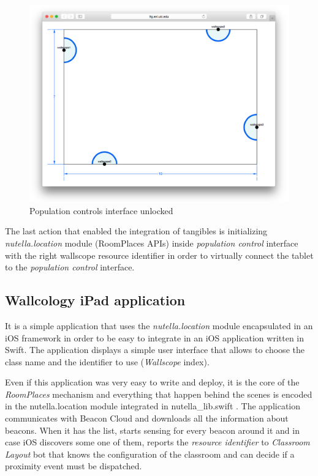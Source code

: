\begin{figure}
\centering
\includegraphics[width=4.5in]{images/wallcology-classroom-layout.png}
\caption{Population controls interface unlocked}
\label{fig:wallcology_classroom_layout}
\end{figure}

The last action that enabled the integration of tangibles is initializing \textit{nutella.location} module (RoomPlaces APIs) inside \textit{population control} interface with the right wallscope resource identifier in order to virtually connect the tablet to the \textit{population control} interface.

\subsection{Wallcology iPad application}
It is a simple application that uses the \textit{nutella.location} module encapsulated in an iOS framework in order to be easy to integrate in an iOS application written in Swift. The application displays a simple user interface that allows to choose the class name and the identifier to use (\textit{Wallscope} index).

Even if this application was very easy to write and deploy, it is the core of the \textit{RoomPlaces} mechanism and everything that happen behind the scenes is encoded in the nutella.location module integrated in nutella\_lib.swift \cite{nutella_lib_swift}. The application communicates with Beacon Cloud and downloads all the information about beacons. When it has the list, starts sensing for every beacon around it and in case iOS discovers some one of them, reports the \textit{resource identifier} to \textit{Classroom Layout} bot that knows the configuration of the classroom and can decide if a proximity event must be dispatched.

